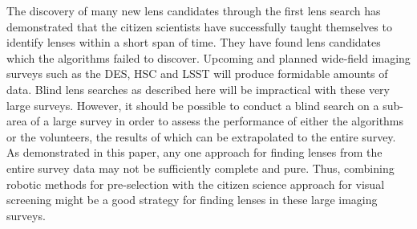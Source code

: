 \documentclass[useAMS,usenatbib,a4paper]{mn2e}
\begin{document}
The discovery of many new lens candidates through the first \sw lens
search has demonstrated that the citizen scientists have successfully
taught themselves to identify lenses within a short span of time.  They
have found lens candidates which the algorithms failed to discover.
Upcoming and planned wide-field imaging surveys such as the DES, HSC and
LSST will produce formidable amounts of data.  Blind lens searches as
described here will be impractical with these very large surveys. However,
it should be possible to conduct a blind search on a sub-area of a large survey in
order to assess the performance of either the algorithms or the
volunteers, the results of which can be extrapolated to the entire survey.  As
demonstrated in this paper, any one approach for finding lenses from the
entire survey data may not be sufficiently complete and pure. Thus, combining
robotic methods for pre-selection with the citizen science approach for
visual screening might be a good strategy for finding lenses in these
large imaging surveys.
\end{document}
